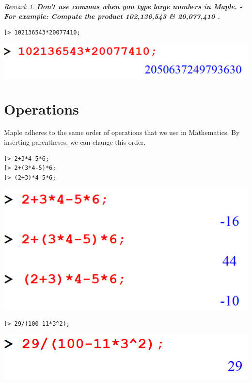 \documentclass[
]{book}
\theoremstyle{definition}
\theoremstyle{definition}
\theoremstyle{definition}
\theoremstyle{definition}
\theoremstyle{remark}
\newtheorem*{remark}{Remark}
\begin{document}
\begin{remark}
\textbf{\emph{Don't use commas when you type large numbers in Maple.
- For example: Compute the product 102,136,543 \& 20,077,410 .}}
\end{remark}

\begin{verbatim}
[> 102136543*20077410;
\end{verbatim}

\includegraphics{figures/Lesson 1/fig13.png}

\section{Operations}\label{operations-1}

Maple adheres to the same order of operations that we use in Mathematics. By inserting parentheses, we can change this order.

\begin{verbatim}
[> 2+3*4-5*6;
[> 2+(3*4-5)*6;
[> (2+3)*4-5*6;
\end{verbatim}

\includegraphics{figures/Lesson 1/fig14.png}

\begin{verbatim}
[> 29/(100-11*3^2);
\end{verbatim}

\includegraphics{figures/Lesson 1/fig15.png}
\end{document}
